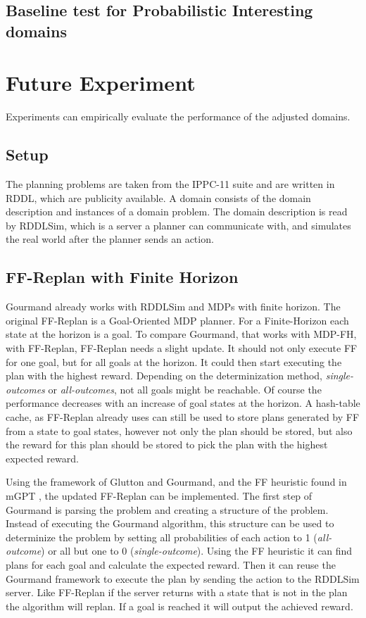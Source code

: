 \documentclass[runningheads,a4paper]{llncs}
\begin{document}
\subsection{Baseline test for Probabilistic Interesting domains}


\section{Future Experiment}
\label{sec:experiment}

Experiments can empirically evaluate the performance of the adjusted domains.

\subsection{Setup}

The planning problems are taken from the IPPC-11 suite and are written in RDDL,
which are publicity available. A domain consists of the domain description and
instances of a domain problem. The domain description is read by RDDLSim, which
is a server a planner can communicate with, and simulates the real world after
the planner sends an action.

\subsection{FF-Replan with Finite Horizon}

Gourmand already works with RDDLSim and MDPs with finite horizon. The original
FF-Replan is a Goal-Oriented MDP planner. For a Finite-Horizon each state at
the horizon is a goal. To compare Gourmand, that works with MDP-FH, with
FF-Replan, FF-Replan needs a slight update. It should not only execute FF for
one goal, but for all goals at the horizon. It could then start executing the
plan with the highest reward. Depending on the determinization method,
\emph{single-outcomes} or \emph{all-outcomes}, not all goals might be
reachable. Of course the performance decreases with an increase of goal states
at the horizon. A hash-table cache, as FF-Replan already uses can still be used
to store plans generated by FF from a state to goal states, however not only
the plan should be stored, but also the reward for this plan should be stored
to pick the plan with the highest expected reward.

Using the framework of Glutton and Gourmand, and the FF heuristic found in mGPT
\cite{bonet2011mgpt}, the updated FF-Replan can be implemented. The first step
of Gourmand is parsing the problem and creating a structure of the problem.
Instead of executing the Gourmand algorithm, this structure can be used to
determinize the problem by setting all probabilities of each action to 1
(\emph{all-outcome}) or all but one to 0 (\emph{single-outcome}). Using the
FF heuristic it can find plans for each goal and calculate the expected reward.
Then it can reuse the Gourmand framework to execute the plan by sending the
action to the RDDLSim server. Like FF-Replan if the server returns with a state
that is not in the plan the algorithm will replan. If a goal is reached it will
output the achieved reward.
\end{document}
